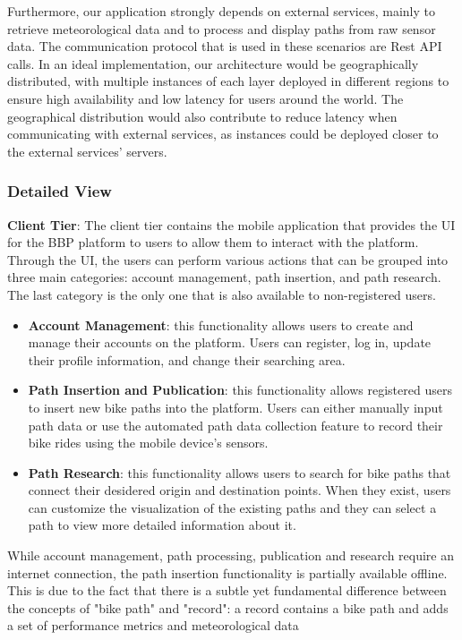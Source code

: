 Furthermore, our application strongly depends on external services, mainly to retrieve meteorological data and to process and display paths from raw sensor data. The communication protocol that is used in these scenarios are Rest API calls.
In an ideal implementation, our architecture would be geographically distributed, with multiple instances of each layer deployed in different regions to ensure high availability and low latency for users around the world.
The geographical distribution would also contribute to reduce latency when communicating with external services, as instances could be deployed closer to the external services' servers.

\subsubsection{Detailed View}
\textbf{Client Tier}: The client tier contains the mobile application that provides the UI for the BBP platform to users to allow them to interact with the platform. Through the UI, the users can
perform various actions that can be grouped into three main categories: account management, path insertion, and path research. The last category is the only one that is also available to non-registered users.
\begin{itemize}
    \item \textbf{Account Management}: this functionality allows users to create and manage their accounts on the platform. Users can register, log in, update their profile information, and change their searching area.
    \item \textbf{Path Insertion and Publication}: this functionality allows registered users to insert new bike paths into the platform. Users can either manually input path data or use the automated path data collection feature to record their bike rides using the mobile device's sensors.
    \item \textbf{Path Research}: this functionality allows users to search for bike paths that connect their desidered origin and destination points. When they exist, users can customize the visualization of the existing paths
    and they can select a path to view more detailed information about it.
\end{itemize}
While account management, path processing, publication and research require an internet connection, the path insertion functionality is partially available offline. This is due to the fact that there is a subtle yet fundamental difference between the concepts of "bike path" and "record": a record contains a bike path and adds a set of performance metrics and meteorological data
